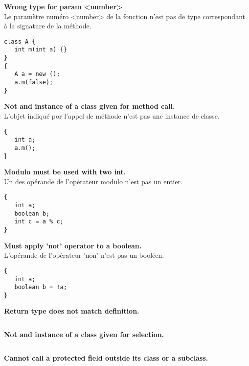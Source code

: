 \documentclass[a4,12pt]{article}
\begin{document}
\textbf{Wrong type for param <number>}\\
Le paramètre numéro <number> de la fonction n'est pas de type correspondant à la signature de la méthode.
\begin{lstlisting}
class A {
   int m(int a) {}
}
{
   A a = new ();
   a.m(false);
}
\end{lstlisting}




\textbf{Not and instance of a class given for method call.}\\
L'objet indiqué por l'appel de méthode n'est pas une instance de classe.
\begin{lstlisting}
{
   int a;
   a.m();
}
\end{lstlisting}




\textbf{Modulo must be used with two int.}\\
Un des opérande de l'opérateur modulo n'est pas un entier.
\begin{lstlisting}
{
   int a;
   boolean b;
   int c = a % c;
}
\end{lstlisting}




\textbf{Must apply 'not' operator to a boolean.}\\
L'opérande de l'opérateur 'non' n'est pas un booléen.
\begin{lstlisting}
{
   int a;
   boolean b = !a;
}
\end{lstlisting}




\textbf{Return type does not match definition.}\\

\begin{lstlisting}

\end{lstlisting}




\textbf{Not and instance of a class given for selection.}\\

\begin{lstlisting}

\end{lstlisting}




\textbf{Cannot call a protected field outside its class or a subclass.}\\

\begin{lstlisting}

\end{lstlisting}
\end{document}
